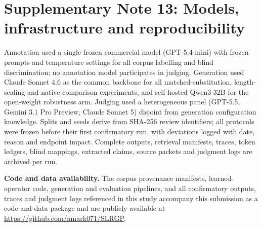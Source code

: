 \documentclass[11pt,a4paper]{article}
\newcommand{\snote}[1]{\section*{Supplementary Note #1}}
\begin{document}
\snote{13: Models, infrastructure and reproducibility}

Annotation used a single frozen commercial model (GPT-5.4-mini) with frozen prompts and temperature settings for all corpus labelling and blind discrimination; no annotation model participates in judging. Generation used Claude Sonnet 4.6 as the common backbone for all matched-substitution, length-scaling and native-comparison experiments, and self-hosted Qwen3-32B for the open-weight robustness arm. Judging used a heterogeneous panel (GPT-5.5, Gemini 3.1 Pro Preview, Claude Sonnet 5) disjoint from generation configuration knowledge. Splits and seeds derive from SHA-256 review identifiers; all protocols were frozen before their first confirmatory run, with deviations logged with date, reason and endpoint impact. Complete outputs, retrieval manifests, traces, token ledgers, blind mappings, extracted claims, source packets and judgment logs are archived per run.

\textbf{Code and data availability.} The corpus provenance manifests, learned-operator code, generation and evaluation pipelines, and all confirmatory outputs, traces and judgment logs referenced in this study accompany this submission as a code-and-data package and are publicly available at \url{https://github.com/amark071/SLRGP}.
\end{document}
